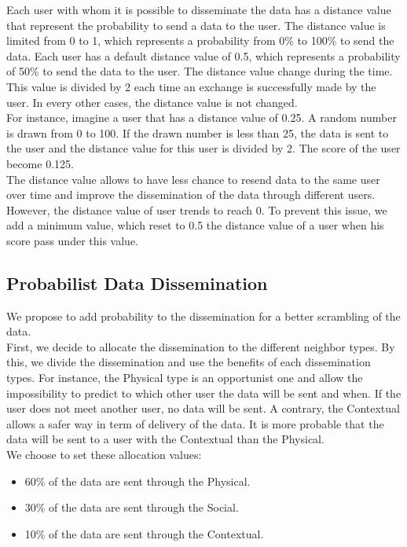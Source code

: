 Each user with whom it is possible to disseminate the data has a distance value that represent the probability to send a data to the user.
The distance value is limited from 0 to 1, which represents a probability from 0\% to 100\% to send the data.
Each user has a default distance value of 0.5, which represents a probability of 50\% to send the data to the user.
The distance value change during the time.
This value is divided by 2 each time an exchange is successfully made by the user.
In every other cases, the distance value is not changed.
\\

For instance, imagine a user that has a distance value of 0.25. 
A random number is drawn from 0 to 100.
If the drawn number is less than 25, the data is sent to the user and the distance value for this user is divided by 2.
The score of the user become 0.125.
\\

The distance value allows to have less chance to resend data to the same user over time and improve the dissemination of the data through different users.
\\

However, the distance value of user trends to reach 0.
To prevent this issue, we add a minimum value, which reset to 0.5 the distance value of a user when his score pass under this value.

\subsection{Probabilist Data Dissemination}

We propose to add probability to the dissemination for a better scrambling of the data.
\\

First, we decide to allocate the dissemination to the different neighbor types.
By this, we divide the dissemination and use the benefits of each dissemination types.
For instance, the Physical type is an opportunist one and allow the impossibility to predict to which other user the data will be sent and when.
If the user does not meet another user, no data will be sent.
A contrary, the Contextual allows a safer way in term of delivery of the data.
It is more probable that the data will be sent to a user with the Contextual than the Physical.
\\

We choose to set these allocation values:
\begin{itemize}
    \item 60\% of the data are sent through the Physical.
    \item 30\% of the data are sent through the Social.
    \item 10\% of the data are sent through the Contextual.
\end{itemize}

